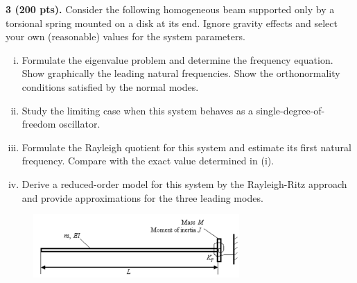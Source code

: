 \begin{problem}
    \textbf{3 (200 pts).} 
    Consider the following homogeneous beam supported only by a torsional spring mounted on a disk at its end. 
    Ignore gravity effects and select your own (reasonable) values for the system parameters.
    \begin{enumerate}[(i)]
        \item {
            Formulate the eigenvalue problem and determine the frequency equation. 
            Show graphically the leading natural frequencies. Show the orthonormality conditions satisfied by the normal modes.
        }
        \item {
            Study the limiting case when this system behaves as a single-degree-of-freedom oscillator.
        }
        \item {
            Formulate the Rayleigh quotient for this system and estimate its first natural frequency.
            Compare with the exact value determined in (i).
        }
        \item {
            Derive a reduced-order model for this system by the Rayleigh-Ritz approach and provide approximations for the three leading modes.
        }
    \end{enumerate}
\end{problem}
\begin{figure}[!ht]
    \centering
    \includegraphics[width=0.7\textwidth]{homework/hw5/assets/hw5_p3_setup.png}
\end{figure}
